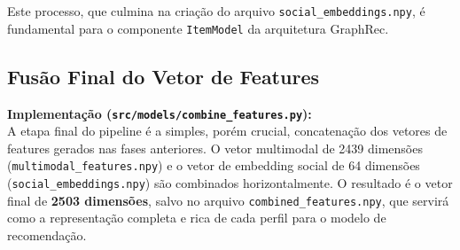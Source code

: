 Este processo, que culmina na criação do arquivo \texttt{social\_embeddings.npy}, é fundamental para o componente \texttt{ItemModel} da arquitetura GraphRec.

\subsection{Fusão Final do Vetor de Features}
\textbf{Implementação (\texttt{src/models/combine\_features.py}):} \\
A etapa final do pipeline é a simples, porém crucial, concatenação dos vetores de features gerados nas fases anteriores. O vetor multimodal de 2439 dimensões (\texttt{multimodal\_features.npy}) e o vetor de embedding social de 64 dimensões (\texttt{social\_embeddings.npy}) são combinados horizontalmente. O resultado é o vetor final de \textbf{2503 dimensões}, salvo no arquivo \texttt{combined\_features.npy}, que servirá como a representação completa e rica de cada perfil para o modelo de recomendação.